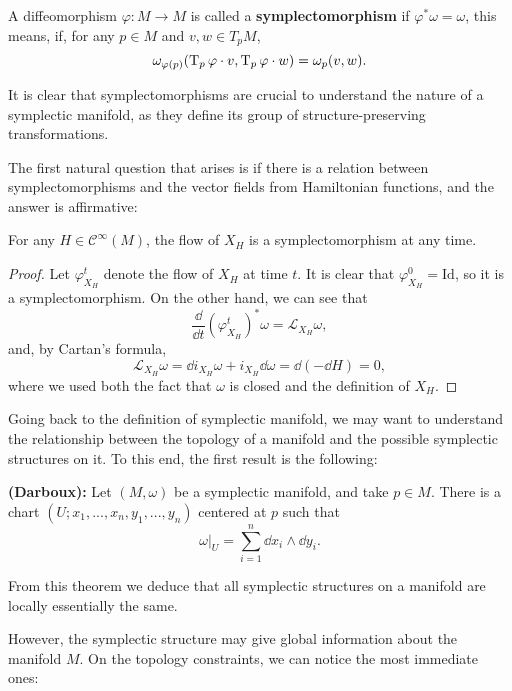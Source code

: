 \begin{deff}
A diffeomorphism $\varphi : M \rightarrow M$ is called a {\bf symplectomorphism} if $\varphi^{\ast} \omega = \omega$, this means, if, for any $p \in M$ and $v, w \in T_pM$,
$$\omega_{\varphi(p)}(\operatorname T_p \varphi \cdot v, \operatorname T_p \varphi \cdot w) = \omega_p(v,w) .$$
\end{deff}

It is clear that symplectomorphisms are crucial to understand the nature of a symplectic manifold, as they define its group of structure-preserving transformations.

The first natural question that arises is if there is a relation between symplectomorphisms and the vector fields from Hamiltonian functions, and the answer is affirmative:

\begin{prop}
For any $H \in \mathcal{C}^{\infty}(M)$, the flow of $X_H$ is a symplectomorphism at any time.
\end{prop}

\begin{proof}
Let $\varphi_{X_H}^t$ denote the flow of $X_H$ at time $t$. It is clear that $\varphi_{X_H}^0 = \text{Id}$, so it is a symplectomorphism. On the other hand, we can see that
$$\frac{\dd}{\dd t} (\varphi_{X_H}^t)^{\ast} \omega = \mathcal{L}_{X_H} \omega ,$$
and, by Cartan's formula,
$$\mathcal{L}_{X_H} \omega = \dd i_{X_H} \omega + i_{X_H} \dd \omega = \dd (- \dd H) = 0 ,$$
where we used both the fact that $\omega$ is closed and the definition of $X_H$.
\end{proof}

Going back to the definition of symplectic manifold, we may want to understand the relationship between the topology of a manifold and the possible symplectic structures on it. To this end, the first result is the following:

\begin{theo}
{\bf (Darboux):} Let $(M,\omega)$ be a symplectic manifold, and take $p \in M$. There is a chart $(U;x_1,...,x_n,y_1,...,y_n)$ centered at $p$ such that
$$\left. \omega \right|_U = \sum_{i=1}^n \dd x_i \wedge \dd y_i .$$
\end{theo}

From this theorem we deduce that all symplectic structures on a manifold are locally essentially the same.

However, the symplectic structure may give global information about the manifold $M$. On the topology constraints, we can notice the most immediate ones:

